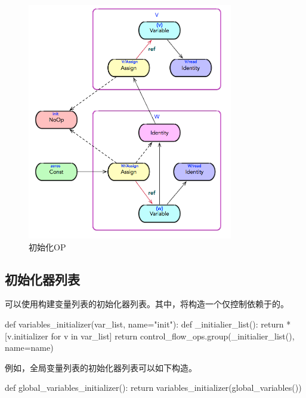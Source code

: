 \begin{content}
\begin{figure}[!h]
\centering
\includegraphics[width=0.8\textwidth]{figures/variable-initialization-dependency-2.png}
\caption{初始化OP}
 \label{fig:variable-initialization-dependency-2}
\end{figure}

\subsection{初始化器列表}

可以使用构建变量列表的初始化器列表。其中，将构造一个仅控制依赖于的。

\begin{leftbar}
\begin{python}
def variables_initializer(var_list, name="init"):
  def _initialier_list():
    return *[v.initializer for v in var_list]
  return control_flow_ops.group(_initialier_list(), name=name)
\end{python}
\end{leftbar}

例如，全局变量列表的初始化器列表可以如下构造。

\begin{leftbar}
\begin{python}
def global_variables_initializer():
  return variables_initializer(global_variables())
\end{python}
\end{leftbar}

\end{content}

